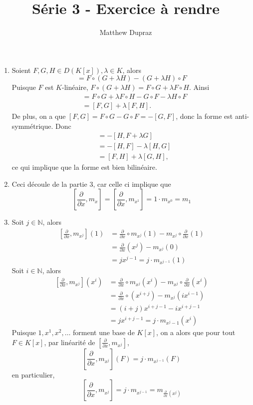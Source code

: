 \documentclass[french]{article}
\title{Série 3 - Exercice à rendre}
\author{Matthew Dupraz}
\newcommand{\dx}{\frac{\partial}{\partial x}}
\newcommand{\ls}{\left[}
\newcommand{\rs}{\right]}
\newcommand{\N}{\mathbb{N}}
\begin{document}
\maketitle

\begin{enumerate}
	\item Soient $F, G, H \in D(K[x]), \lambda \in K$, alors
		\begin{equation*}
			[F, G+\lambda H] = F \circ (G + \lambda H)
			- (G + \lambda H) \circ F
		\end{equation*}
		Puisque $F$ est $K$-linéaire, $F\circ(G + \lambda H) = 
		F \circ G + \lambda F \circ H$.
		Ainsi
		\begin{align*}
			[F, G + \lambda H] &= F\circ G + \lambda F\circ H
			- G \circ F - \lambda H \circ F\\
			&= [F, G] + \lambda [F, H].
		\end{align*}
		De plus, on a que $[F, G] = F\circ G - G\circ F = -[G, F]$,
		donc la forme est anti-symmétrique.
		Donc
		\begin{align*}
			[F + \lambda G, H] &= -[H, F + \lambda G]\\
			&= -[H, F] - \lambda[H, G]\\
			&= [F, H] + \lambda[G, H],
		\end{align*}
		ce qui implique que la forme est bien bilinéaire.
	\item Ceci découle de la partie $3$, car celle ci implique que
		\begin{equation*}
			\ls\dx, m_x\rs	= \ls\dx, m_{x^1}\rs = 1\cdot m_{x^0} = m_1
		\end{equation*}
	\item Soit $j \in \N$, alors
		\begin{align*}
			\ls \dx, m_{x^j}\rs(1) &= \dx \circ m_{x^j}(1) - m_{x^j}\circ\dx(1)\\
			&= \dx(x^j) - m_{x^j}(0) \\
			&= j x^{j - 1} = j \cdot m_{x^{j-1}}(1)
		\end{align*}
		Soit $i\in \N$, alors
		\begin{align*}
			\ls \dx, m_{x^j}\rs(x^i) &= \dx \circ m_{x^j}(x^i)
			- m_{x^j}\circ\dx(x^i)\\
			&= \dx \circ (x^{i + j}) - m_{x^j}(ix^{i-1})\\
			&= (i + j)x^{i + j - 1} - ix^{i + j - 1}\\
			&= jx^{i + j - 1} = j\cdot m_{x^j-1} (x^i)
		\end{align*}
		Puisque $1, x^1, x^2, \dots$ forment une base de $K[x]$, on a alors que
		pour tout $F \in K[x]$, par linéarité de $\ls\dx, m_{x^j}\rs$,
		\begin{equation*}
			\ls\dx, m_{x^j}\rs(F) = j\cdot m_{x^{j-1}}(F)
		\end{equation*}
		en particulier, 
		\begin{equation*}
			\ls\dx, m_{x^j}\rs = j\cdot m_{x^{j-1}} = m_{\dx(x^j)}
		\end{equation*}


\end{enumerate}
\end{document}
